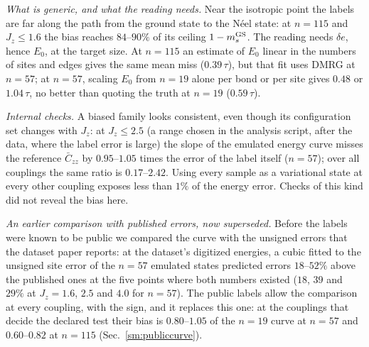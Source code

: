 \documentclass[aps,prx,onecolumn,10pt,nofootinbib,longbibliography,floatfix]{revtex4-2}
\theoremstyle{remark}
\newcommand{\Jz}{J_z}
\newcommand{\Czz}{\bar C_{zz}}
\newcommand{\de}{\delta e}
\begin{document}
\emph{What is generic, and what the reading needs.} Near the isotropic point the labels are far along the path from
the ground state to the N\'eel state: at $n=115$ and $\Jz\le1.6$ the bias reaches $84$--$90\%$ of its ceiling %
$1-m_s^{\rm GS}$. The reading needs $\de$, hence $E_0$, at the target size. At $n=115$ an estimate of $E_0$ linear in
the numbers of sites and edges gives the same mean miss ($0.39\,\tau$), but that fit uses DMRG at $n=57$; at $n=57$, %
scaling $E_0$ from $n=19$ alone per bond or per site gives $0.48$ or $1.04\,\tau$, no better than quoting the truth %
at $n=19$ ($0.59\,\tau$). %

\emph{Internal checks.} A biased family looks consistent, even though its configuration set changes with $\Jz$: at
$\Jz\le2.5$ (a range chosen in the analysis script, after the data, where the label error is large) the slope of the %
emulated energy curve misses the reference $\Czz$ by $0.95$--$1.05$ times the error of the label itself ($n=57$); %
over all couplings the same ratio is $0.17$--$2.42$. Using every sample as a variational state at every other %
coupling exposes less than $1\%$ of the energy error. Checks of this kind did not reveal the bias here. %

\emph{An earlier comparison with published errors, now superseded.} Before the labels were known to be public we
compared the curve with the unsigned errors that the dataset paper reports: at the dataset's digitized energies, a
cubic fitted to the unsigned site error of the $n=57$ emulated states predicted errors $18$--$52\%$ above the %
published ones at the five points where both numbers existed ($18$, $39$ and $29\%$ at $\Jz=1.6$, $2.5$ and $4.0$ %
for $n=57$). The public labels allow the comparison at every coupling, with the sign, and it replaces this one: at
the couplings that decide the declared test their bias is $0.80$--$1.05$ of the $n=19$ curve at $n=57$ and %
$0.60$--$0.82$ at $n=115$ (Sec.~\ref{sm:publiccurve}). %
\end{document}
